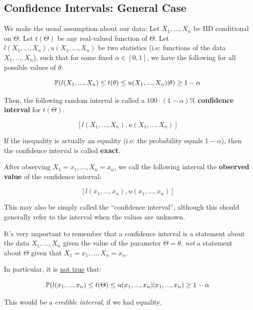 \documentclass[a4paper]{article}
\begin{document}
        \subsection{Confidence Intervals: General Case}
            \begin{definition}
                We make the usual assumption about our data: Let $X_1, ..., X_n$
                be IID conditional on $\Theta$. Let $t(\Theta)$ be any
                real-valued function of $\Theta$. Let $l(X_1, ..., X_n), u(X_1,
                ..., X_n)$ be two statistics (i.e: functions of the data $X_1,
                ..., X_n$), such that for some fixed $\alpha \in [0, 1]$, we
                have the following for all possible values of $\theta$:

                \[
                    \mathbb{P}(l(X_1, ..., X_n) \leq t(\theta) \leq u(X_1, ...,
                    X_n) | \theta) \geq 1 - \alpha
                \]

                Then, the following random interval is called a $100 \cdot (1 -
                \alpha)$\% \textbf{confidence interval} for $t(\Theta)$.

                \[
                    [l(X_1, ..., X_n), u(X_1, ..., X_n)]
                \]

                If the inequality is actually an equality (i.e: the probability
                equals $1 - \alpha$), then the confidence interval is called
                \textbf{exact}.

                After observing $X_1 = x_1, ..., X_n = x_n$, we call the
                following interval the \textbf{observed value} of the confidence
                interval:

                \[
                    [l(x_1, ..., x_n), u(x_1, ..., x_n)]
                \]

                This may also be simply called the ``confidence interval'',
                although this should generally refer to the interval when the
                values are unknown.
            \end{definition}

            \begin{warn}
                It's very important to remember that a confidence interval is
                a statement about the data $X_1, ..., X_n$ given the value of
                the parameter $\Theta = \theta$, \textit{not} a statement about
                $\Theta$ given that $X_1 = x_1, ..., X_n = x_n$.

                In particular, it is \underline{not true} that:

                \[
                    \mathbb{P}(l(x_1, ..., x_n) \leq t(\Theta) \leq u(x_1, ...,
                    x_n) | x_1, ..., x_n) \geq 1 - \alpha
                \]

                This would be a \textit{credible interval}, if we had equality.
            \end{warn}
\end{document}
